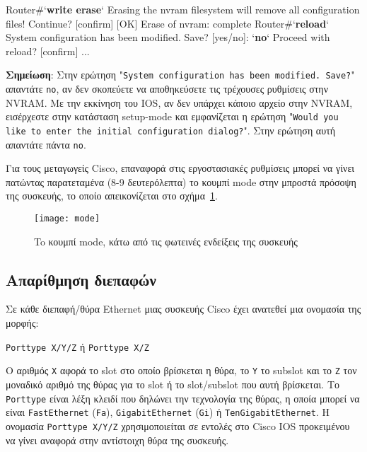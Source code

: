 \documentclass{EdipyLabs} %
\begin{document}
\begin{CommandBox}
Router#`\textbf{write erase}`
Erasing the nvram filesystem will remove all configuration files! Continue? [confirm]
[OK]
Erase of nvram: complete
Router#`\textbf{reload}`
System configuration has been modified. Save? [yes/no]: `\textbf{no}`
Proceed with reload? [confirm]
...
\end{CommandBox}

\textbf{Σημείωση}: Στην ερώτηση "\texttt{System configuration has been modified. Save?}" απαντάτε \texttt{no}, αν δεν σκοπεύετε να αποθηκεύσετε τις τρέχουσες ρυθμίσεις στην NVRAM. Με την εκκίνηση του IOS, αν δεν υπάρχει κάποιο αρχείο στην NVRAM, εισέρχεστε στην κατάσταση setup-mode και εμφανίζεται η ερώτηση "\texttt{Would you like to enter the initial configuration dialog?}". Στην ερώτηση αυτή απαντάτε πάντα \texttt{no}.

Για τους μεταγωγείς Cisco, επαναφορά στις εργοστασιακές ρυθμίσεις μπορεί να γίνει πατώντας παρατεταμένα (8-9 δευτερόλεπτα) το κουμπί mode στην μπροστά πρόσοψη της συσκευής, το οποίο απεικονίζεται στο σχήμα~\ref{fig:mode}.

\begin{figure}[ht]
	\centering
	\texttt{[image: mode]}
	\caption{To κουμπί mode, κάτω από τις φωτεινές ενδείξεις της συσκευής}\label{fig:mode}
\end{figure}

\subsection{Απαρίθμηση διεπαφών}
Σε κάθε διεπαφή/θύρα Ethernet μιας συσκευής Cisco έχει ανατεθεί μια ονομασία της μορφής:

\begin{center}
	\texttt{\large Porttype Χ/Υ/Z}\hspace*{0.5cm} ή\hspace*{0.5cm} \texttt{\large Porttype Χ/Z}
\end{center}

Ο αριθμός \texttt{Χ} αφορά το slot στο οποίο βρίσκεται η θύρα, το \texttt{Y} το subslot και το \texttt{Z} τον μοναδικό αριθμό της θύρας για το slot ή το slot/subslot που αυτή βρίσκεται. Το \texttt{Porttype} είναι λέξη κλειδί που δηλώνει την τεχνολογία της θύρας, η οποία μπορεί να είναι \texttt{FastEthernet} (\texttt{Fa}), \texttt{GigabitEthernet} (\texttt{Gi}) ή \texttt{TenGigabitEthernet}. Η ονομασία \texttt{Porttype Χ/Υ/Z} χρησιμοποιείται σε εντολές στο Cisco IOS προκειμένου να γίνει αναφορά στην αντίστοιχη θύρα της συσκευής.
\end{document}
